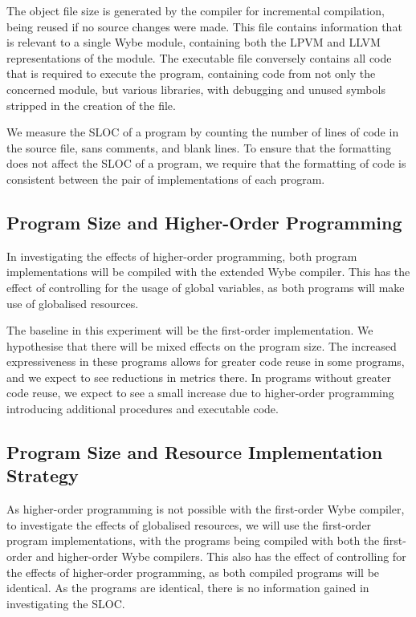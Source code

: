 The object file size is generated by the compiler for incremental compilation, being reused if no source changes were made. This file contains information that is relevant to a single Wybe module, containing both the LPVM and LLVM representations of the module. The executable file conversely contains all code that is required to execute the program, containing code from not only the concerned module, but various libraries, with debugging and unused symbols stripped in the creation of the file.

We measure the SLOC of a program by counting the number of lines of code in the source file, sans comments, and blank lines. To ensure that the formatting does not affect the SLOC of a program, we require that the formatting of code is consistent between the pair of implementations of each program.

\subsection{Program Size and Higher-Order Programming}

In investigating the effects of higher-order programming, both program implementations will be compiled with the extended Wybe compiler. This has the effect of controlling for the usage of global variables, as both programs will make use of globalised resources. 

The baseline in this experiment will be the first-order implementation. We hypothesise that there will be mixed effects on the program size. The increased expressiveness in these programs allows for greater code reuse in some programs, and we expect to see reductions in metrics there. In programs without greater code reuse, we expect to see a small increase due to higher-order programming introducing additional procedures and executable code.

\subsection{Program Size and Resource Implementation Strategy}

As higher-order programming is not possible with the first-order Wybe compiler, to investigate the effects of globalised resources, we will use the first-order program implementations, with the programs being compiled with both the first-order and higher-order Wybe compilers. This also has the effect of controlling for the effects of higher-order programming, as both compiled programs will be identical. As the programs are identical, there is no information gained in investigating the SLOC.

